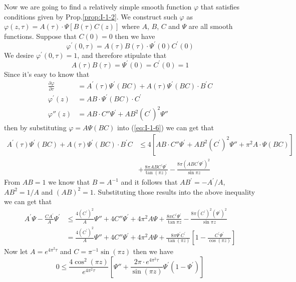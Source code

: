 Now we are going to find a relatively simple smooth function $\varphi$ that satisfies conditions given by Prop.\ref{prop:I-1-2}. We construct such $\varphi$ as $\varphi (z,\tau)=A(\tau)\cdot\Psi[B(\tau)C(z)]$ where $A$, $B$, $C$ and $\Psi$ are all smooth functions. Suppose that $C(0)=0$ then we have
\begin{equation*}
    \varphi^\prime(0,\tau)=A(\tau)B(\tau)\cdot\Psi^\prime(0)C^\prime(0)
\end{equation*}
We desire $\varphi^\prime(0,\tau)=1$, and therefore stipulate that
\begin{equation*}
    A(\tau)B(\tau)=\Psi^\prime(0)=C^\prime(0)=1
\end{equation*}
Since it's easy to know that
\begin{align*}
    \frac{\partial\varphi}{\partial\tau}&=A^\prime(\tau)\Psi^\prime(BC)+A(\tau)\Psi^\prime(BC)\cdot B^\prime C\\
    \varphi^\prime(z)&=AB\cdot\Psi^\prime(BC)\cdot C^\prime\\
    \varphi{''}(z)&=AB\cdot C{''}\Psi^\prime+AB^2 {\left(C^\prime\right)}^2\Psi{''}
\end{align*}
then by substituting $\varphi=A\Psi(BC)$ into (\ref{eq:I-1-6}) we can get that
\begin{align*}
    A^\prime(\tau)\Psi^\prime(BC)+A(\tau)\Psi^\prime(BC)\cdot B^\prime C&\le 4\left[AB\cdot C{''}\Psi^\prime+AB^2 {\left(C^\prime\right)}^2\Psi{''}+\pi^2 A\cdot \Psi(BC)\right]\\
    &+\frac{8\pi ABC^\prime\Psi^\prime}{\tan{(\pi z)}}-\frac{8\pi{\left(ABC^\prime\Psi^\prime\right)}^2}{\sin{\pi z}}
\end{align*}
From $AB=1$ we know that $B=A^{-1}$ and it follows that $AB^\prime=-A^\prime/A$, $AB^2=1/A$ and ${(AB)}^2=1$. Substituting those results into the above inequality we can get that
\begin{align*}
    A^\prime\Psi-\frac{CA^\prime}{A}\Psi^\prime&\le\frac{4{\left(C^\prime\right)}^2}{A}\Psi{''}+4C{''}\Psi^\prime+4\pi^2A\Psi+\frac{8\pi C^\prime\Psi^\prime}{\tan{\pi z}}-\frac{8\pi{\left(C^\prime\right)}^2{\left(\Psi^\prime\right)}^2}{\sin{\pi z}}\\
    &=\frac{4{\left(C^\prime\right)}^2}{A}\Psi{''}+4C{''}\Psi^\prime+4\pi^2A\Psi+\frac{8\pi\Psi^\prime C^\prime}{\tan{(\pi z)}}\left[1-\frac{C^\prime\Psi^\prime}{\cos{(\pi z)}}\right]
\end{align*}
Now let $A=e^{4\pi^2\tau}$ and $C=\pi^{-1}\sin{(\pi z)}$ then we have
\begin{equation*}
    0\le \frac{4\cos^2{(\pi z)}}{e^{4\pi^2\tau}}\left[\Psi{''}+\frac{2\pi\cdot e^{4\pi^2\tau}}{\sin{(\pi z)}}\Psi^\prime(1-\Psi^\prime)\right]
\end{equation*}
